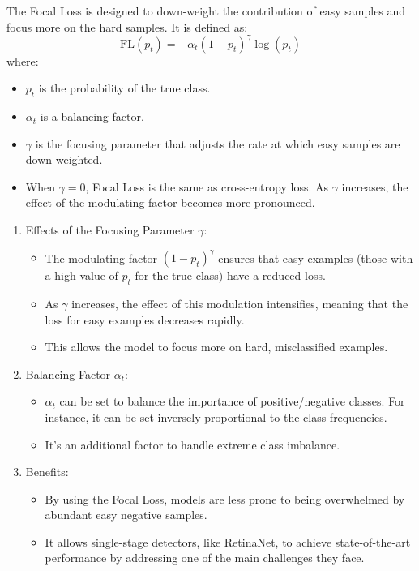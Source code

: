 \documentclass{article}
\begin{document}
The Focal Loss is designed to down-weight the contribution of easy samples and focus more on the hard samples.
It is defined as:
\[ \text{FL}(p_t) = -\alpha_t (1 - p_t)^\gamma \log(p_t) \]
where:

\begin{itemize}
    \item \( p_t \) is the probability of the true class.
    \item \( \alpha_t \) is a balancing factor.
    \item \( \gamma \) is the focusing parameter that adjusts the rate at which easy samples are down-weighted.
    \item When \( \gamma = 0 \), Focal Loss is the same as cross-entropy loss. As \( \gamma \) increases, the effect of the modulating factor becomes more pronounced.
\end{itemize}


\begin{enumerate}
  \item Effects of the Focusing Parameter \( \gamma \):
  \begin{itemize}
    \item The modulating factor \( (1 - p_t)^\gamma \) ensures that easy examples (those with a high value of \( p_t \) for the true class) have a reduced loss.
    \item As \( \gamma \) increases, the effect of this modulation intensifies, meaning that the loss for easy examples decreases rapidly.
    \item This allows the model to focus more on hard, misclassified examples.
\end{itemize}
  \item Balancing Factor \( \alpha_t \):
  \begin{itemize}
    \item \( \alpha_t \) can be set to balance the importance of positive/negative classes. For instance, it can be set inversely proportional to the class frequencies.
    \item It's an additional factor to handle extreme class imbalance.
\end{itemize}
  \item Benefits:
  \begin{itemize}
    \item By using the Focal Loss, models are less prone to being overwhelmed by abundant easy negative samples.
    \item It allows single-stage detectors, like RetinaNet, to achieve state-of-the-art performance by addressing one of the main challenges they face.
\end{itemize}
\end{enumerate}
\end{document}
